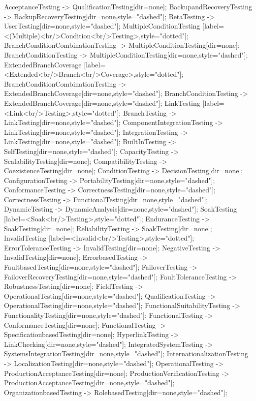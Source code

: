 \documentclass{article}
\begin{document}
{AcceptanceTesting -> QualificationTesting[dir=none];
BackupandRecoveryTesting -> BackupRecoveryTesting[dir=none,style="dashed"];
BetaTesting -> UserTesting[dir=none,style="dashed"];
MultipleConditionTesting [label=<(Multiple)<br/>Condition<br/>Testing>,style="dotted"];
BranchConditionCombinationTesting -> MultipleConditionTesting[dir=none];
BranchConditionTesting -> MultipleConditionTesting[dir=none,style="dashed"];
ExtendedBranchCoverage [label=<Extended<br/>Branch<br/>Coverage>,style="dotted"];
BranchConditionCombinationTesting -> ExtendedBranchCoverage[dir=none,style="dashed"];
BranchConditionTesting -> ExtendedBranchCoverage[dir=none,style="dashed"];
LinkTesting [label=<Link<br/>Testing>,style="dotted"];
BranchTesting -> LinkTesting[dir=none,style="dashed"];
ComponentIntegrationTesting -> LinkTesting[dir=none,style="dashed"];
IntegrationTesting -> LinkTesting[dir=none,style="dashed"];
BuiltInTesting -> SelfTesting[dir=none,style="dashed"];
CapacityTesting -> ScalabilityTesting[dir=none];
CompatibilityTesting -> CoexistenceTesting[dir=none];
ConditionTesting -> DecisionTesting[dir=none];
ConfigurationTesting -> PortabilityTesting[dir=none,style="dashed"];
ConformanceTesting -> CorrectnessTesting[dir=none,style="dashed"];
CorrectnessTesting -> FunctionalTesting[dir=none,style="dashed"];
DynamicTesting -> DynamicAnalysis[dir=none,style="dashed"];
SoakTesting [label=<Soak<br/>Testing>,style="dotted"];
EnduranceTesting -> SoakTesting[dir=none];
ReliabilityTesting -> SoakTesting[dir=none];
InvalidTesting [label=<Invalid<br/>Testing>,style="dotted"];
ErrorToleranceTesting -> InvalidTesting[dir=none];
NegativeTesting -> InvalidTesting[dir=none];
ErrorbasedTesting -> FaultbasedTesting[dir=none,style="dashed"];
FailoverTesting -> FailoverRecoveryTesting[dir=none,style="dashed"];
FaultToleranceTesting -> RobustnessTesting[dir=none];
FieldTesting -> OperationalTesting[dir=none,style="dashed"];
QualificationTesting -> OperationalTesting[dir=none,style="dashed"];
FunctionalSuitabilityTesting -> FunctionalityTesting[dir=none,style="dashed"];
FunctionalTesting -> ConformanceTesting[dir=none];
FunctionalTesting -> SpecificationbasedTesting[dir=none];
HyperlinkTesting -> LinkChecking[dir=none,style="dashed"];
IntegratedSystemTesting -> SystemsIntegrationTesting[dir=none,style="dashed"];
InternationalizationTesting -> LocalizationTesting[dir=none,style="dashed"];
OperationalTesting -> ProductionAcceptanceTesting[dir=none];
ProductionVerificationTesting -> ProductionAcceptanceTesting[dir=none,style="dashed"];
OrganizationbasedTesting -> RolebasedTesting[dir=none,style="dashed"];
}
\end{document}
